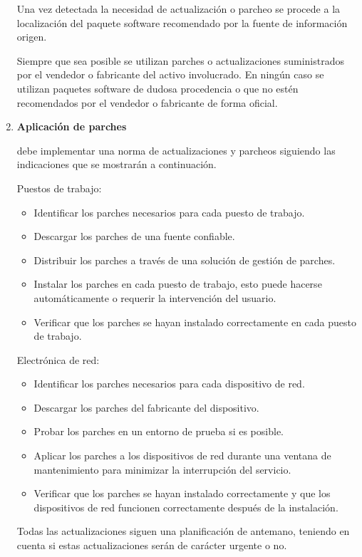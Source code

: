 \begin{enumerate}[label=\alph*)]
Una vez detectada la necesidad de actualización o parcheo se procede a la localización del paquete software recomendado por la fuente de información origen.

Siempre que sea posible se utilizan parches o actualizaciones suministrados por el vendedor o fabricante del activo involucrado. En ningún caso se utilizan paquetes software de dudosa procedencia o que no estén recomendados por el vendedor o fabricante de forma oficial.

\item \textbf{Aplicación de parches}

\Beneficiario{} debe implementar una norma de actualizaciones y parcheos siguiendo las indicaciones que se mostrarán a continuación.

Puestos de trabajo:

\begin{itemize}
    \item Identificar los parches necesarios para cada puesto de trabajo.
    \item Descargar los parches de una fuente confiable.
    \item Distribuir los parches a través de una solución de gestión de parches.
    \item Instalar los parches en cada puesto de trabajo, esto puede hacerse automáticamente o requerir la intervención del usuario.
    \item Verificar que los parches se hayan instalado correctamente en cada puesto de trabajo.
\end{itemize}

Electrónica de red:

\begin{itemize}
    \item Identificar los parches necesarios para cada dispositivo de red.
    \item Descargar los parches del fabricante del dispositivo.
    \item Probar los parches en un entorno de prueba si es posible.
    \item Aplicar los parches a los dispositivos de red durante una ventana de mantenimiento para minimizar la interrupción del servicio.
    \item Verificar que los parches se hayan instalado correctamente y que los dispositivos de red funcionen correctamente después de la instalación.
\end{itemize}

Todas las actualizaciones siguen una planificación de antemano, teniendo en cuenta si estas actualizaciones serán de carácter urgente o no.


\end{enumerate}
